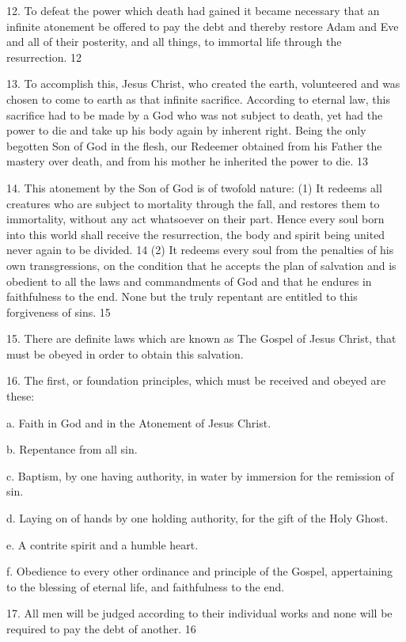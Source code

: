 12. To defeat the power which death had gained it became necessary that an infinite
atonement be offered to pay the debt and thereby restore Adam and Eve and all of their
posterity, and all things, to immortal life through the resurrection. 12

13. To accomplish this, Jesus Christ, who created the earth, volunteered and was chosen to
come to earth as that infinite sacrifice. According to eternal law, this sacrifice had to be made
by a God who was not subject to death, yet had the power to die and take up his body again
by inherent right. Being the only begotten Son of God in the flesh, our Redeemer obtained
from his Father the mastery over death, and from his mother he inherited the power to die. 13

14. This atonement by the Son of God is of twofold nature: (1) It redeems all creatures who
are subject to mortality through the fall, and restores them to immortality, without any act
whatsoever on their part. Hence every soul born into this world shall receive the resurrection,
the body and spirit being united never again to be divided. 14 (2) It redeems every soul from
the penalties of his own transgressions, on the condition that he accepts the plan of salvation
and is obedient to all the laws and commandments of God and that he endures in faithfulness
to the end. None but the truly repentant are entitled to this forgiveness of sins. 15

15. There are definite laws which are known as The Gospel of Jesus Christ, that must be
obeyed in order to obtain this salvation.

16. The first, or foundation principles, which must be received and obeyed are these:

a. Faith in God and in the Atonement of Jesus Christ.

b. Repentance from all sin.

c. Baptism, by one having authority, in water by immersion for the remission of sin.

d. Laying on of hands by one holding authority, for the gift of the Holy Ghost.

e. A contrite spirit and a humble heart.

f. Obedience to every other ordinance and principle of the Gospel, appertaining to the
blessing of eternal life, and faithfulness to the end.

17. All men will be judged according to their individual works and none will be required to
pay the debt of another. 16

